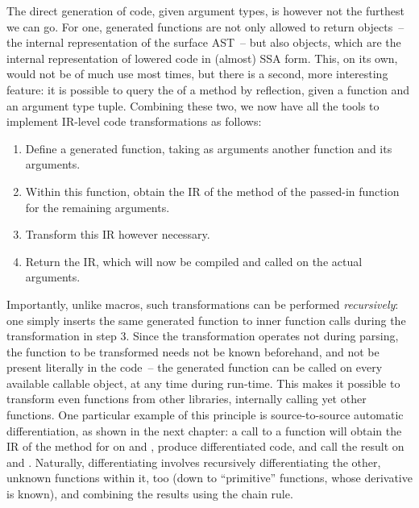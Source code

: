 The direct generation of code, given argument types, is however not the furthest we can go.  For
one, generated functions are not only allowed to return  objects~-- the internal
representation of the surface AST~-- but also  objects, which are the internal
representation of lowered code in (almost) SSA form.  This, on its own, would not be of much use
most times, but there is a second, more interesting feature: it is possible to query the
 of a method by reflection, given a function and an argument type tuple.  Combining
these two, we now have all the tools to implement IR-level code transformations as follows:
\begin{enumerate}
  \firmlist
\item Define a generated function, taking as arguments another function and its arguments.
\item Within this function, obtain the IR of the method of the passed-in function for the remaining
  arguments.
\item Transform this IR however necessary.
\item Return the IR, which will now be compiled and called on the actual arguments.
\end{enumerate}
Importantly, unlike macros, such transformations can be performed \emph{recursively}: one simply
inserts the same generated function to inner function calls during the transformation in step 3.
Since the transformation operates not during parsing, the function to be transformed needs not be
known beforehand, and not be present literally in the code~-- the generated function can be called
on every available callable object, at any time during run-time.  This makes it possible to transform
even functions from other libraries, internally calling yet other functions.  One particular example
of this principle is source-to-source automatic differentiation, as shown in the next chapter: a
call to a function  will obtain the IR of the method for  on
 and , produce differentiated code, and call the result on
 and .  Naturally, differentiating  involves recursively differentiating
the other, unknown functions within it, too (down to \enquote{primitive} functions, whose derivative
is known), and combining the results using the chain rule.

